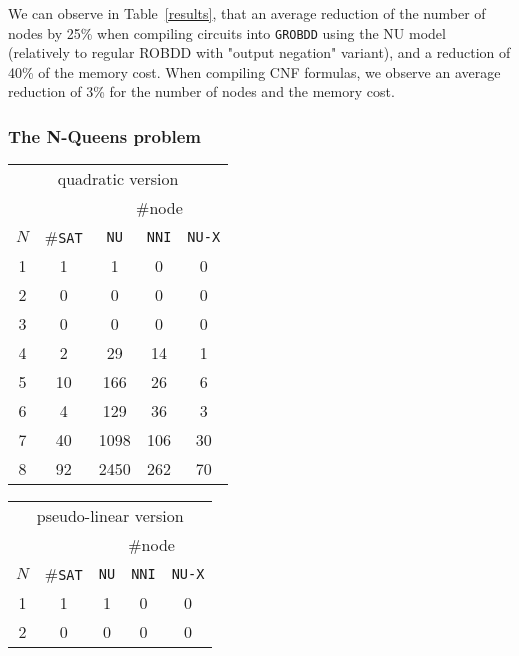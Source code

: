 \documentclass[a4paper,10pt]{article}
\newcommand{\GroBdd}{\texttt{GROBDD}}
\begin{document}
We can observe in Table~\ref{results}, that an average reduction of the number of nodes by 25\% when compiling circuits into \GroBdd{} using the NU model (relatively to regular ROBDD with "output negation" variant), and a reduction of 40\% of the memory cost.
When compiling CNF formulas, we observe an average reduction of 3\% for the number of nodes and the memory cost.

\subsubsection{The N-Queens problem}



\begin{table}[h]
\center
\begin{tabular}{|c | c | c | c | c |}
\multicolumn{5}{|c|}{quadratic version} \\
& & \multicolumn{3}{|c|}{\#node} \\
$N$ & \#\texttt{SAT} & \texttt{NU} & \texttt{NNI} & \texttt{NU-X} \\ \hline
1   & 1              & 1           & 0            & 0             \\
2   & 0              & 0           & 0            & 0             \\
3   & 0              & 0           & 0            & 0             \\
4   & 2              & 29          & 14           & 1             \\
5   & 10             & 166         & 26           & 6             \\
6   & 4              & 129         & 36           & 3             \\
7   & 40             & 1098        & 106          & 30            \\
8   & 92             & 2450        & 262          & 70            \\
\end{tabular}
\begin{tabular}{|c | c | c | c | c |}
\multicolumn{5}{|c|}{pseudo-linear version} \\
& & \multicolumn{3}{|c|}{\#node} \\
$N$ & \#\texttt{SAT} & \texttt{NU} & \texttt{NNI} & \texttt{NU-X} \\ \hline
1   & 1              & 1           & 0            & 0             \\
2   & 0              & 0           & 0            & 0             \\

\end{tabular}
\end{table}
\end{document}
